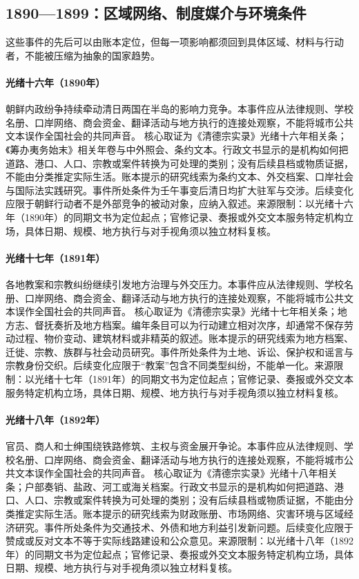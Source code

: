 \subsection{1890—1899：区域网络、制度媒介与环境条件}
这些事件的先后可以由账本定位，但每一项影响都须回到具体区域、材料与行动者，不能被压缩为抽象的国家趋势。
\hypertarget{civic:EQ-1890-KOREAN-POLITICAL-CONFLICT}{}\paragraph{光绪十六年（1890年）}朝鲜内政纷争持续牵动清日两国在半岛的影响力竞争。本事件应从法律规则、学校名册、口岸网络、商会资金、翻译活动与地方执行的连接处观察，不能将城市公共文本误作全国社会的共同声音。 核心取证为《清德宗实录》光绪十六年相关条；《筹办夷务始末》相关年卷与中外照会、条约文本。行政文书显示的是机构如何把道路、港口、人口、宗教或案件转换为可处理的类别；没有后续县档或物质证据，不能由分类推定实际生活。账本提示的研究线索为条约文本、外交档案、口岸社会与国际法实践研究。事件所处条件为壬午事变后清日均扩大驻军与交涉。后续变化应限于朝鲜行动者不是外部竞争的被动对象，应纳入叙述。来源限制：以光绪十六年（1890年）的同期文书为定位起点；官修记录、奏报或外交文本服务特定机构立场，具体日期、规模、地方执行与对手视角须以独立材料复核。
\hypertarget{civic:EQ-1891-MISSIONARY-CONFLICTS}{}\paragraph{光绪十七年（1891年）}各地教案和宗教纠纷继续引发地方治理与外交压力。本事件应从法律规则、学校名册、口岸网络、商会资金、翻译活动与地方执行的连接处观察，不能将城市公共文本误作全国社会的共同声音。 核心取证为《清德宗实录》光绪十七年相关条；地方志、督抚奏折及地方档案。编年条目可以为行动建立相对次序，却通常不保存劳动过程、物价变动、建筑材料或非精英的叙述。账本提示的研究线索为地方档案、迁徙、宗教、族群与社会动员研究。事件所处条件为土地、诉讼、保护权和谣言与宗教身份交织。后续变化应限于“教案”包含不同类型纠纷，不能单一化。来源限制：以光绪十七年（1891年）的同期文书为定位起点；官修记录、奏报或外交文本服务特定机构立场，具体日期、规模、地方执行与对手视角须以独立材料复核。
\hypertarget{civic:EQ-1892-RAILWAY-DEBATE}{}\paragraph{光绪十八年（1892年）}官员、商人和士绅围绕铁路修筑、主权与资金展开争论。本事件应从法律规则、学校名册、口岸网络、商会资金、翻译活动与地方执行的连接处观察，不能将城市公共文本误作全国社会的共同声音。 核心取证为《清德宗实录》光绪十八年相关条；户部奏销、盐政、河工或海关档案。行政文书显示的是机构如何把道路、港口、人口、宗教或案件转换为可处理的类别；没有后续县档或物质证据，不能由分类推定实际生活。账本提示的研究线索为财政账册、市场网络、灾害环境与区域经济研究。事件所处条件为交通技术、外债和地方利益引发新问题。后续变化应限于赞成或反对文本不等于实际线路建设和公众意见。来源限制：以光绪十八年（1892年）的同期文书为定位起点；官修记录、奏报或外交文本服务特定机构立场，具体日期、规模、地方执行与对手视角须以独立材料复核。
